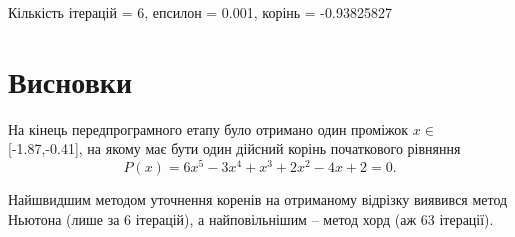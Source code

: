 \documentclass[a4paper,14pt]{extarticle} %
\begin{document}
Кількість ітерацій = 6, епсилон = 0.001, корінь = -0.93825827

\section{Висновки}

На кінець передпрограмного етапу було отримано один проміжок
$x \in $[-1.87,-0.41], на якому має бути один дійсний корінь 
початкового рівняння \[ P(x)=6x^5-3x^4+x^3+2x^2-4x+2=0.\]

Найшвидшим методом уточнення коренів на отриманому відрізку 
виявився метод Ньютона (лише за 6 ітерацій), а найповільнішим -- 
метод хорд (аж 63 ітерації).
\end{document}
